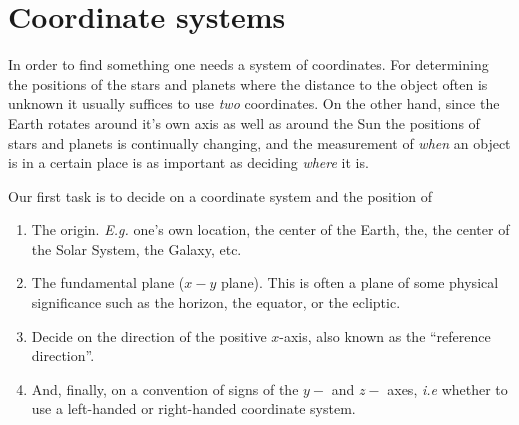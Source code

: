 
%
\section{Coordinate systems}

In order to find something one needs a system of coordinates. For 
determining the positions of the stars and planets where the 
distance to the object often is unknown it usually suffices to use {\it two} 
coordinates. On the other hand, since the Earth rotates around it's 
own axis as well as around the Sun the positions of stars and planets 
is continually changing, and the measurement of {\it when} an object 
is in a certain place is as important as deciding {\it where} it is. 

Our first task is to decide on a coordinate system and the position of
\begin{enumerate}
\item The origin. {\it E.g.} one's own location, the center of the Earth,
the, the center of the Solar System, the Galaxy, etc. 
\item The fundamental plane ($x-y$ plane). This is often a plane of some
physical significance such as the horizon, the equator, or the ecliptic.
\item Decide on the direction of the positive $x$-axis, also known as
the ``reference direction''. 
\item And, finally, on a convention of signs of the $y-$ and $z-$ axes, {\it i.e} whether
to use a left-handed or right-handed coordinate system.
\end{enumerate}

